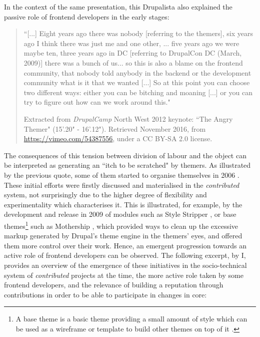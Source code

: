In the context of the same presentation, this Drupalista also explained the passive role of frontend developers in the early stages:

\begin{quotation}
``[...] Eight years ago there was nobody [referring to the themers], six years ago I think there was just me and one other, ... five years ago we were maybe ten, three years ago in DC [referring to DrupalCon DC (March, 2009)] there was a bunch of us... so this is also a blame on the frontend community, that nobody told anybody in the backend or the development community what is it that we wanted [...] So at this point you can choose two different ways: either you can be bitching and moaning [...] or you can try to figure out how can we work around this."
\begin{flushright}\footnotesize{Extracted from \textit{DrupalCamp} North West 2012 keynote: ``The Angry Themer" (15'.20" - 16'.12"). Retrieved  November 2016, from \url{https://vimeo.com/54387556}, under a CC BY-SA 2.0 license.}\end{flushright}
    \end{quotation}

The consequences of this tension between division of labour and the object can be interpreted as generating an ``itch to be scratched" \parencite{torvalds2001just} by themers. As illustrated by the previous quote, some of them started to organise themselves in 2006 \parencite{morten-history:Online}. These initial efforts were firstly discussed and materialised in the \textit{contributed} system, not surprisingly due to the higher degree of flexibility and experimentality which characterises it. This is illustrated, for example, by the development and release in 2009 of modules such as Style Stripper \parencite{styletripper:Online}, or base themes\footnote{A base theme is a basic theme providing a small amount of style which can be used as a wireframe or template to build other themes on top of it \parencite{base-theme:Online}.} such as Mothership \parencite{mothership:Online}, which provided ways to clean up the excessive markup generated by Drupal's theme engine in the themers' eyes, and offered them more control over their work. Hence, an emergent progression towards an active role of frontend developers can be observed. The following excerpt, by I, provides an overview of the emergence of these initiatives in the socio-technical system of \textit{contributed} projects at the time, the more active role taken by some frontend developers, and the relevance of building a reputation through contributions in order to be able to participate in changes in core:

